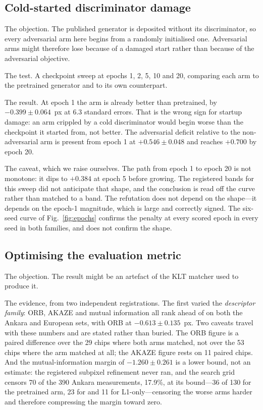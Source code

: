 \subsection{Cold-started discriminator damage}

The objection. The published generator is deposited without its discriminator,
so every adversarial arm here begins from a randomly initialised one. Adversarial arms
might therefore lose because of a damaged start rather than because of the adversarial
objective.

The test. A checkpoint sweep at epochs 1, 2, 5, 10 and 20, comparing each arm to
the pretrained generator and to its own counterpart.

The result. At epoch 1 the \advLone{} arm is already better than
pretrained, by $-0.399 \pm 0.064$~px at 6.3 standard errors. That is the wrong
sign for startup damage: an arm crippled by a cold discriminator would begin worse than
the checkpoint it started from, not better. The adversarial deficit relative to the
non-adversarial arm is present from epoch 1 at $+0.546 \pm 0.048$ and reaches $+0.700$ by
epoch 20.

The caveat, which we raise ourselves. The path from epoch 1 to
epoch 20 is not monotone: it dips to $+0.384$ at epoch 5 before growing. The registered bands for this sweep did not anticipate that shape, and the conclusion is
read off the curve rather than matched to a band. The refutation does not depend
on the shape---it depends on the epoch-1 magnitude, which is large and correctly signed. The six-seed curve of Fig.~\ref{fig:epochs} confirms the penalty at every scored epoch
in every seed in both families, and does not confirm the shape.

\subsection{Optimising the evaluation metric}

The objection. The result might be an artefact of the KLT matcher used to
produce it.

The evidence, from two independent registrations. The first varied the
\emph{descriptor family}: ORB, AKAZE and mutual information all rank \Lone{} ahead of
\advLone{} on both the Ankara and European sets, with ORB at $-0.613 \pm 0.135$~px.
Two caveats travel with these numbers and are stated rather than buried. The ORB
figure is a paired difference over the 29 chips where both arms matched, not over
the 53 chips where the \Lone{} arm matched at all; the AKAZE figure rests on 11 paired
chips. And the mutual-information margin of $-1.260 \pm 0.261$ is a lower bound,
not an estimate: the registered subpixel refinement never ran, and the search grid censors
70 of the 390 Ankara measurements, 17.9\%, at its bound---36 of 130 for the pretrained
arm, 23 for \advLone{} and 11 for L1-only---censoring the worse arms harder and
therefore compressing the margin toward zero.

